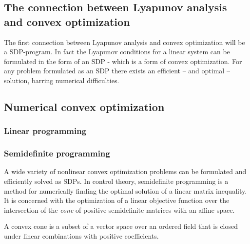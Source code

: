 \subsection{The connection between Lyapunov analysis and convex optimization}

The first connection between Lyapunov analysis and convex optimization will be a
\ac{SDP}-program. In fact the Lyapunov conditions for a linear system can be
formulated in the form of an \ac{SDP} - which is a form of convex optimization.
For any problem formulated as an \ac{SDP} there exists an efficient -- and
optimal -- solution, barring numerical difficulties.

\subsection{Numerical convex optimization}

\subsubsection{Linear programming}

\subsubsection{Semidefinite programming}

A wide variety of nonlinear convex optimization problems can be formulated and
efficiently solved as \ac{SDP}s. In control theory, semidefinite programming is
a method for numerically finding the optimal solution of a linear matrix
inequality. It is concerned with the optimization of a linear objective function
over the intersection of the \textit{cone} of positive semidefinite matrices
with an affine space.

A convex cone is a subset of a vector space over an ordered field that is closed
under linear combinations with positive coefficients.

